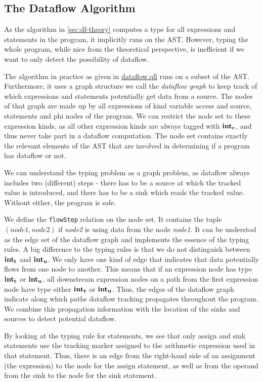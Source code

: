 \subsection{The Dataflow Algorithm}
As the algorithm in \autoref{sec:df-theory} computes a type for all expressions and statements in the program,
it implicitly runs on the AST.
However, typing the whole program, while nice from the theoretical perspective, is 
inefficient if we want to only detect the possibility of dataflow.

The algorithm in practice as given in \hyperref[lst:dataflow]{dataflow.qll} runs on a subset of the AST.
Furthermore, it uses a graph structure we call the \emph{dataflow graph} to keep
track of which expressions and statements potentially get data from a source.
The nodes of that graph are made up by all expressions of kind variable access and source,
statements and phi nodes of the program.
We can restrict the node set to these expression kinds, as all other expression kinds
are always tagged with $\textbf{int}_\textbf{c}$, and thus never take part in a dataflow computation.
The node set contains  exactly the relevant elements of the AST that are involved in determining
if a program has dataflow or not.

We can understand the typing problem as a graph problem, as
dataflow always includes two (different) steps - there has to be a source at which 
the tracked value is introduced, and there has to be a sink which reads the tracked value.
Without either, the program is safe.

We define the \texttt{flowStep} relation on the node set.
It contains the tuple $(\textit{node1}, \textit{node2})$ if \textit{node2} is using
data from the node \textit{node1}.
It can be understod as the edge set of the dataflow graph and implements the
essence of the typing rules.
A big difference to the typing rules is that we do not distinguish between $\textbf{int}_\textbf{t}$ and $\textbf{int}_\textbf{u}$.
We only have one kind of edge that indicates that data potentially flows 
from one node to another.
This means that if an expression node has type $\textbf{int}_\textbf{t}$ or $\textbf{int}_\textbf{u}$,
all downstream expression nodes on a path from the first expression node 
have type either $\textbf{int}_\textbf{t}$ or $\textbf{int}_\textbf{u}$.
Thus, the edges of the dataflow graph indicate along which paths dataflow tracking propagates
throughout the program.
We combine this propagation information with the location of the sinks and sources 
to detect potential dataflow.

By looking at the typing rule for statements, we see that only assign and sink statements
use the tracking marker assigned to the arithmetic expression used in that statement.
Thus, there is an edge from the right-hand side of an assignment (the expression) 
to the node for the assign statement, as well as from the operand from the sink 
to the node for the sink statement.

